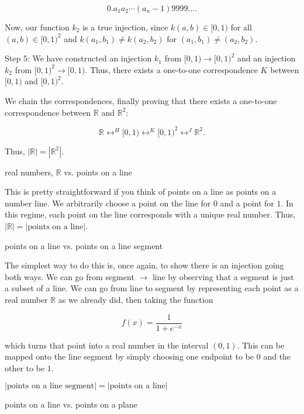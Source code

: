 \documentclass[../gatm_answers.tex]{subfiles}
\begin{document}
$$0.a_1a_2\cdots (a_n-1)9999....$$

Now, our function $k_2$ is a true injection, since $k(a,b)\in [0,1)$ for all $(a,b)\in [0,1)^2$ and $k(a_1,b_1)\neq k(a_2,b_2)$ for $(a_1,b_1)\neq (a_2,b_2)$.

Step 5: We have constructed an injection $k_1$ from $[0,1)\to [0,1)^2$ and an injection $k_2$ from $[0,1)^2\to [0,1)$. Thus, there exists a one-to-one correspondence $K$ between $[0,1)$ and $[0,1)^2$.

We chain the correspondences, finally proving that there exists a one-to-one correspondence between $\mathbb{R}$ and $\mathbb{R}^2$:

$$\mathbb{R} \mathop{\leftrightarrow} ^{H} [0,1) \mathop{\leftrightarrow} ^ {K} [0,1)^2 \mathop{\leftrightarrow} ^ {J} \mathbb{R}^2.$$

Thus, $|\mathbb{R}|=\left|\mathbb{R}^2\right|$.

\begin{inner_problem}
\item real numbers, $\mathbb{R}$ vs. points on a line
\end{inner_problem}

This is pretty straightforward if you think of points on a line as points on a number line. We arbitrarily choose a point on the line for $0$ and a point for $1$. In this regime, each point on the line corresponds with a unique real number. Thus, $|\mathbb{R}| = |\text{points on a line}|$.

\begin{inner_problem}
\item points on a line vs. points on a line segment
\end{inner_problem}

The simplest way to do this is, once again, to show there is an injection going both ways. We can go from segment $\to$ line by observing that a segment is just a subset of a line. We can go from line to segment by representing each point as a real number $\mathbb{R}$ as we already did, then taking the function

$$f(x)=\frac{1}{1+e^{-x}}$$

which turns that point into a real number in the interval $(0,1)$. This can be mapped onto the line segment by simply choosing one endpoint to be $0$ and the other to be $1$.

$|\text{points on a line segment}| = |\text{points on a line}|$

\begin{inner_problem}
\item points on a line vs. points on a plane
\end{inner_problem}
\end{document}
